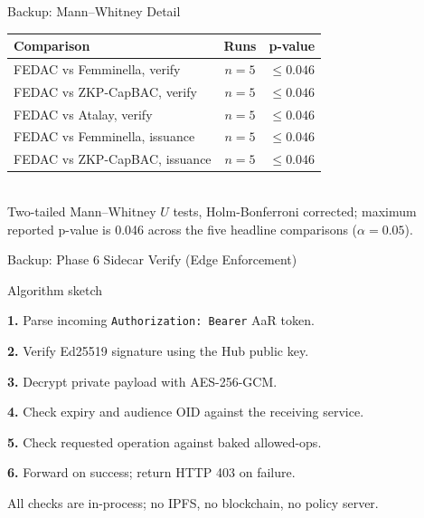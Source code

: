 \documentclass[aspectratio=169,11pt]{beamer}
\newenvironment{plainsteps}{%
  \begin{list}{}{%
    \setlength{\leftmargin}{24pt}%
    \setlength{\topsep}{2pt}%
    \setlength{\itemsep}{3pt}%
    \setlength{\parsep}{0pt}%
  }%
}{\end{list}}
\newcommand{\pinkbanner}[1]{%
  \begin{center}
  \begin{tcolorbox}[colback=fedacGray,colframe=fedacGray,
                    boxrule=0pt,arc=1mm,left=10pt,right=10pt,top=3pt,bottom=3pt,
                    width=0.96\linewidth,
                    borderline west={2pt}{0pt}{fedacTeal}]
  \footnotesize\color{fedacNavyD}#1
  \end{tcolorbox}
  \end{center}}
\begin{document}
{
\begin{frame}[noframenumbering]{Backup: Mann--Whitney Detail}
\centering\vspace{6pt}
\footnotesize
\setlength{\tabcolsep}{8pt}
\renewcommand{\arraystretch}{1.25}
\begin{tabular}{l c c}
\toprule
\rowcolor{fedacGray}\textbf{Comparison} & \textbf{Runs} & \textbf{p-value}\\
\midrule
FEDAC vs Femminella, verify    & $n=5$ & $\le 0.046$\\
FEDAC vs ZKP-CapBAC, verify    & $n=5$ & $\le 0.046$\\
FEDAC vs Atalay, verify        & $n=5$ & $\le 0.046$\\
FEDAC vs Femminella, issuance  & $n=5$ & $\le 0.046$\\
FEDAC vs ZKP-CapBAC, issuance  & $n=5$ & $\le 0.046$\\
\bottomrule
\end{tabular}\\[10pt]
{\footnotesize\color{fedacGrayD}Two-tailed Mann--Whitney $U$ tests, Holm-Bonferroni corrected; maximum reported p-value is 0.046 across the five headline comparisons ($\alpha{=}0.05$).}
\end{frame}

\begin{frame}[noframenumbering]{Backup: Phase 6 Sidecar Verify (Edge Enforcement)}
\vspace{4pt}
\begin{callout}{Algorithm sketch}
\small
\begin{plainsteps}
\item \textbf{1.} Parse incoming \texttt{Authorization: Bearer} AaR token.
\item \textbf{2.} Verify Ed25519 signature using the Hub public key.
\item \textbf{3.} Decrypt private payload with AES-256-GCM.
\item \textbf{4.} Check expiry and audience OID against the receiving service.
\item \textbf{5.} Check requested operation against baked allowed-ops.
\item \textbf{6.} Forward on success; return HTTP 403 on failure.
\end{plainsteps}
\end{callout}
\vspace{4pt}
\pinkbanner{All checks are in-process; no IPFS, no blockchain, no policy server.}
\end{frame}

}
\end{document}
